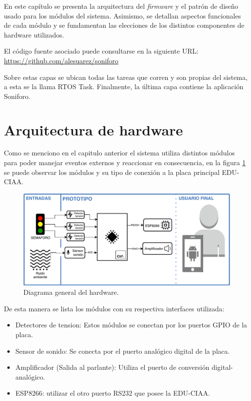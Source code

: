 En este capítulo se presenta la arquitectura del \textit{firmware} y el patrón de diseño usado para los módulos del sistema. Asimismo, se detallan aspectos funcionales de cada módulo y se fundamentan las elecciones de los distintos componentes de hardware utilizados.

El código fuente asociado puede consultarse en la siguiente URL:
\url{https://github.com/alesuarez/soniforo}

Sobre estas capas se ubican todas las tareas que corren y son propias del sistema, a esta se la llama RTOS Task. Finalmente, la última capa contiene la aplicación Soniforo.

\section{Arquitectura de hardware}
Como se menciono en el capitulo anterior el sistema utiliza distintos módulos para poder manejar eventos externos y reaccionar en consecuencia, en la figura \ref{fig:diagramaGeneralHardware} se puede observar los módulos y su tipo de conexión a la placa principal EDU-CIAA.

\begin{figure}[h]
	\centering
	\includegraphics[scale=.7]{./Figures/diagramaGeneralHardware.pdf}
	\caption{Diagrama general del hardware.}
	\label{fig:diagramaGeneralHardware}
\end{figure}

De esta manera se lista los módulos con su respectiva interfaces utilizada:

\begin{itemize}
	\item Detectores de tension: Estos módulos se conectan por los puertos GPIO de la placa.
	\item Sensor de sonido: Se conecta por el puerto analógico digital de la placa.
	\item Amplificador (Salida al parlante): Utiliza el puerto de conversión digital-analógico.
	\item ESP8266: utilizar el otro puerto RS232 que posee la EDU-CIAA.
\end{itemize}

